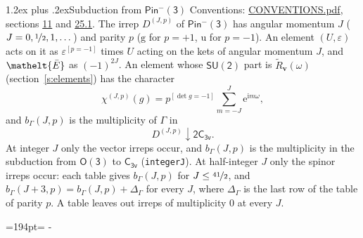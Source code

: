 \documentclass[10pt,a4paper]{article}
\makeatletter
\renewcommand\section{\@startsection{section}{1}{\z@}{-3ex plus -1ex minus -.2ex}%
  {1.2ex plus .2ex}{\normalfont\large\sffamily\bfseries\color{parttitle}}}
\newcommand{\needspace}[1]{\par\penalty-100\begingroup\dimen0=#1\relax\dimen2=\pagegoal
  \advance\dimen2-\pagetotal\ifdim\dimen0>\dimen2\relax\ifdim\dimen2>0pt\vfil\break\fi\fi
  \endgroup}
\numberwithin{equation}{section}
\newcommand{\eltfont}[1]{{\let\sigma\eltsigma\mathelt{#1}}}
\newcommand{\grp}[1]{\mathsf{#1}}
\newcommand{\elt}[1]{\eltfont{#1}}
\newcommand{\ptag}[1]{\mathrm{#1}}
\newcommand{\iverson}[1]{[#1]}
\newcommand{\restr}[2]{#1\!\downarrow#2}
\newcommand{\vv}{\mathbf{v}}
\newcommand{\iunit}{\mathrm{i}}
\newcommand{\expe}{\mathrm{e}}
\newcommand{\irrJp}[2]{D^{(#1,#2)}}
\newcommand{\barred}[1]{\bar{#1}}
\newcommand{\lift}[1]{\tilde{#1}}
\makeatother
\begin{document}
\section{Subduction from \texorpdfstring{$\grp{Pin^{-}(3)}$}{Pin(3)}}\label{s:subduction_parent}
Conventions: \href{../../CONVENTIONS.pdf}{CONVENTIONS.pdf}, sections \href{../../../rotation/CONVENTIONS.pdf\#conv.11}{11} and \href{../../CONVENTIONS.pdf\#conv.25.1}{25.1}.
\leavevmode\label{n:index.J}\label{n:index.parity}\label{n:irrep.o3}The irrep $\irrJp{J}{p}$ of \href{Pinminus3.pdf}{$\grp{Pin^{-}(3)}$} has angular momentum $J$ ($J = 0, \nicefrac{1}{2}, 1, \dots$) and parity $p$ ($\ptag{g}$ for $p = +1$, $\ptag{u}$ for $p = -1$). An element $(U, \varepsilon)$ acts on it as $\varepsilon^{[p = -1]}$ times $U$ acting on the kets of angular momentum $J$, and $\elt{\barred{E}}$ as $(-1)^{2J}$. \label{n:function.character.parent}\label{n:function.multiplicity}An element whose $\grp{SU(2)}$ part is $\lift{R}_{\vv}(\omega)$ (section~\ref{s:elements}) has the character
\begin{equation}\label{e:chi}\chi^{(J,p)}(g) = p^{\iverson{\det g = -1}}\sum_{m=-J}^{J} \expe^{\iunit m\omega},\end{equation}
and $b_\Gamma(J, p)$ is the multiplicity of $\Gamma$ in
\begin{equation}\label{e:parent}\restr{\irrJp{J}{p}}{\grp{2C_{3v}}}.\end{equation}
At integer $J$ only the vector irreps occur, and $b_\Gamma(J, p)$ is the multiplicity in the subduction from $\grp{O(3)}$ to \href{../../../rotation/data/pdf/C3v.pdf}{$\grp{C_{3v}}$} (\texttt{integerJ}). \label{n:index.increment}At half-integer $J$ only the spinor irreps occur: each table gives $b_\Gamma(J, p)$ for $J \le \nicefrac{41}{2}$, and $b_\Gamma(J + 3, p) = b_\Gamma(J, p) + \Delta_\Gamma$ for every $J$, where $\Delta_\Gamma$ is the last row of the table of parity $p$. A table leaves out irreps of multiplicity 0 at every $J$.
\needspace{194pt}
\end{document}
